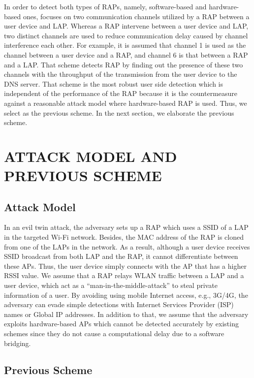 \documentclass[conference]{IEEEtran}
\begin{document}
In order to detect both types of RAPs, namely, software-based and hardware-based ones, \cite{previous} focuses on two communication channels utilized by a RAP between a user device and LAP.
Whereas a RAP intervene between a user device and LAP, two distinct channels are used to reduce communication delay caused by channel interference each other.
For example, it is assumed that channel 1 is used as the channel between a user device and a RAP, and channel 6 is that between a RAP and a LAP.
That scheme detects RAP by finding out the presence of these two channels with the throughput of the transmission from the user device to the DNS server.
That scheme is the most robust user side detection which is independent of the performance of the RAP because it is the countermeasure against a reasonable attack model where hardware-based RAP is used.
Thus, we select \cite{previous} as the previous scheme.
In the next section, we elaborate the previous scheme.

\section{ATTACK MODEL AND PREVIOUS SCHEME}
\subsection{Attack Model}
In an evil twin attack, the adversary sets up a RAP which uses a SSID of a LAP in the targeted Wi-Fi network.
Besides, the MAC address of the RAP is cloned from one of the LAPs in the network.
As a result, although a user device receives SSID broadcast from both LAP and the RAP, it cannot differentiate between these APs.
Thus, the user device simply connects with the AP that has a higher RSSI value.
We assume that a RAP relays WLAN traffic between a LAP and a user device, which act as a ``man-in-the-middle-attack'' to steal private information of a user.
By avoiding using mobile Internet access, e.g., 3G/4G, the adversary can evade simple detections with Internet Services Provider (ISP) names or Global IP addresses\cite{rtt}.
In addition to that, we assume that the adversary exploits hardware-based APs which cannot be detected accurately by existing schemes since they do not cause a computational delay due to a software bridging.

\subsection{Previous Scheme}
\end{document}

